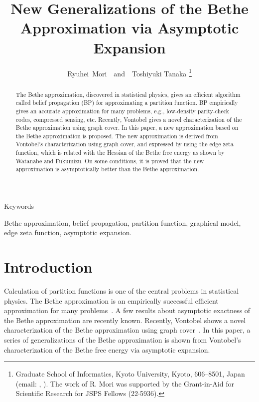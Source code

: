 \documentclass[a4paper,10pt,twoside,twocolumn,openany,final]{memoir}
\title{New Generalizations of the Bethe Approximation via Asymptotic Expansion}
\author{
Ryuhei~Mori~~and~~Toshiyuki Tanaka
\thanks{
Graduate School of Informatics,
Kyoto University,
Kyoto, 606--8501, Japan
(email: \rmmail,\; \ttmail).
The work of R. Mori was supported by the Grant-in-Aid for Scientific Research for JSPS Fellows (22$\cdot$5936).}%
}
\date{}
\theoremstyle{plain}
\theoremstyle{definition}
\theoremstyle{remark}
\begin{document}
\maketitle
\thispagestyle{myheadings}

\begin{abstract}
The Bethe approximation, discovered in statistical physics, gives an efficient algorithm
called belief propagation (BP) for approximating a partition function.
BP empirically gives an accurate approximation for many problems, e.g., low-density parity-check codes, compressed sensing, etc.
Recently, Vontobel gives a novel characterization of the Bethe approximation using graph cover.
In this paper, a new approximation based on the Bethe approximation is proposed.
The new approximation is derived from Vontobel's characterization using graph cover,
and expressed by using the edge zeta function,
which is related with the Hessian of the Bethe free energy as shown by Watanabe and Fukumizu.
On some conditions, it is proved that the new approximation is asymptotically better than the Bethe approximation.
\end{abstract}
\begin{center}
\vspace{-3mm}
Keywords
\end{center}
\vspace{-4mm}
{\small
Bethe approximation, belief propagation, partition function, graphical model, edge zeta function, asymptotic expansion.
}

\section{Introduction}
Calculation of partition functions is one of the central problems in statistical physics.
The Bethe approximation is an empirically successful efficient approximation
for many problems~\cite{mezard2009information}.
A few results about asymptotic exactness of the Bethe approximation are recently known.
Recently, Vontobel shows a novel characterization of the Bethe approximation using graph cover~\cite{vontobel2010counting}.
In this paper, a series of generalizations of the Bethe approximation is shown from Vontobel's characterization of the Bethe free energy
via asymptotic expansion.
\end{document}
